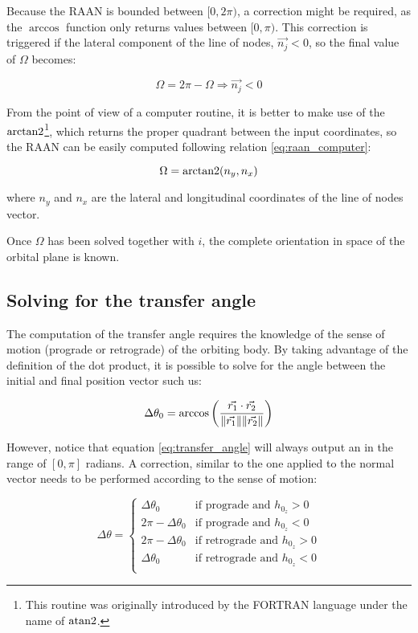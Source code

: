 Because the RAAN is bounded between $[0,2\pi)$, a correction might be required,
as the $\arccos$ function only returns values between $[0,\pi)$. This correction
is triggered if the lateral component of the line of nodes, $\vec{n_{j}} < 0$,
so the final value of $\Omega$ becomes:

\begin{equation}
  \Omega = 2\pi - \Omega \Rightarrow \vec{n_{j}} < 0
  \label{eq:raan_correction}
\end{equation}

From the point of view of a computer routine, it is better to make use of the
$\operatorname{arctan2}$\footnote{This routine was originally introduced by the FORTRAN
  language under the name of $\operatorname{atan2}$.}, which returns the proper quadrant
between the input coordinates, so the RAAN can be easily computed following
relation \ref{eq:raan_computer}:

\begin{equation}
  \Omega = \operatorname{arctan2}(n_{y}, n_{x})
  \label{eq:raan_computer}
\end{equation}

where $n_{y}$ and $n_{x}$ are the lateral and longitudinal coordinates of the
line of nodes vector.

Once $\Omega$ has been solved together with $i$, the complete orientation in
space of the orbital plane is known.

\subsection{Solving for the transfer angle}

The computation of the transfer angle requires the knowledge of the sense of
motion (prograde or retrograde) of the orbiting body. By taking advantage of the
definition of the dot product, it is possible to solve for the angle between the
initial and final position vector such us:

\begin{equation}
  \Delta \theta_0 = \arccos{\left(\frac{\vec{r_1} \cdot \vec{r_2}}{\lVert\vec{r_1}\rVert \lVert\vec{r_2}\rVert}\right)}
  \label{eq:transfer_angle}
\end{equation}

However, notice that equation \ref{eq:transfer_angle} will always output an
in the range of $[0, \pi]$ radians. A correction, similar to the one applied to
the normal vector needs to be performed according to the sense of motion:


\begin{equation}
  \Delta \theta =
  \begin{cases}
    \Delta \theta_0         & \text{if prograde and $h_{0_{z}} > 0$}   \\
    2 \pi - \Delta \theta_0 & \text{if prograde and $h_{0_{z}} < 0$}   \\
    2 \pi - \Delta \theta_0 & \text{if retrograde and $h_{0_{z}} > 0$} \\
    \Delta \theta_0         & \text{if retrograde and $h_{0_{z}} < 0$} \\
  \end{cases}
\end{equation}


